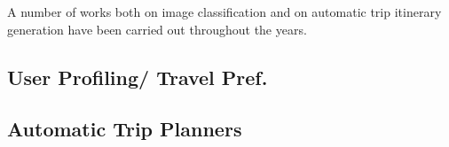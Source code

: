 A number of works both on image classification and on automatic
trip itinerary generation have been carried out throughout the years.

\subsection{User Profiling/ Travel Pref.}


\subsection{Automatic Trip Planners}